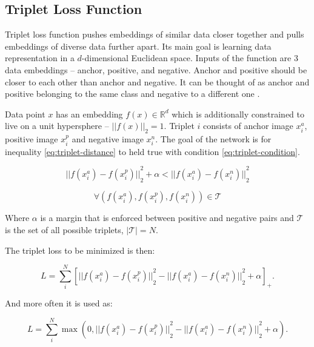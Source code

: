 \subsection{Triplet Loss Function}

Triplet loss function pushes embeddings of similar data closer together and pulls embeddings of diverse data further apart. Its main goal is learning data representation in a $d$-dimensional Euclidean space. Inputs of the function are 3 data embeddings -- anchor, positive, and negative. Anchor and positive should be closer to each other than anchor and negative. It can be thought of as anchor and positive belonging to the same class and negative to a different one \cite{facenet-triplet-loss}.

Data point $x$ has an embedding $f(x) \in \mathbb{R}^d$ which is additionally constrained to live on a unit hypersphere -- ${|| f(x) ||}_2 = 1$. Triplet $i$ consists of anchor image $x^{a}_{i}$, positive image $x^{p}_{i}$ and negative image $x^{n}_{i}$. The goal of the network is for inequality  \ref{eq:triplet-distance} to held true with condition \ref{eq:triplet-condition}.

\begin{equation}
    \label{eq:triplet-distance}
    {|| f(x^{a}_{i}) - f(x^{p}_{i}) ||}^{2}_{2} + \alpha < {|| f(x^{a}_{i}) - f(x^{n}_{i}) ||}^{2}_{2}
\end{equation}

\begin{equation}
    \label{eq:triplet-condition}
    \forall ( f(x^{a}_{i}), f(x^{p}_{i}), f(x^{n}_{i})) \in \mathcal{T}
\end{equation}

\noindent Where $\alpha$ is a margin that is enforced between positive and negative pairs and $\mathcal{T}$ is the set of all possible triplets, $|\mathcal{T}| = N$.

The triplet loss to be minimized is then:

\begin{equation}
    \label{eq:triplet-loss1}
    L = \sum\limits^{N}_{i}
    \left[
    {|| f(x^{a}_{i}) - f(x^{p}_{i}) ||}^{2}_{2} - {|| f(x^{a}_{i}) - f(x^{n}_{i}) ||}^{2}_{2} + \alpha
    \right]_{+}.
\end{equation}

\noindent And more often it is used as:

\begin{equation}
    \label{eq:triplet-loss2}
    L = \sum\limits^{N}_{i}
    \max{(0, {|| f(x^{a}_{i}) - f(x^{p}_{i}) ||}^{2}_{2} - {|| f(x^{a}_{i}) - f(x^{n}_{i}) ||}^{2}_{2} + \alpha)}.
\end{equation}

